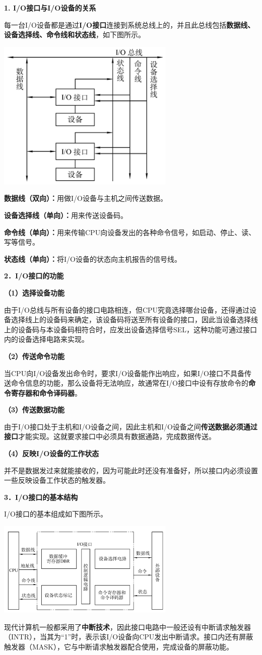 {\textbf{1. I/O接口与I/O设备的关系}}

每一台I/O设备都是通过{\textbf{I/O接口}}连接到系统总线上的，并且此总线包括\textbf{数据线、设备选择线、命令线和状态线}，如下图所示。

\includegraphics[width=3.33333in,height=2.84375in]{png-jpeg-pics/6A896695497C6EA59B53FA9E705171B6.png}

\textbf{数据线（双向）：}用做I/O设备与主机之间传送数据。

\textbf{设备选择线（单向）：}用来传送设备码。

\textbf{命令线（单向）：}用来传输CPU向设备发出的各种命令信号，如启动、停止、读、写等信号。

\textbf{状态线（单向）：}将I/O设备的状态向主机报告的信号线。

{\textbf{2．I/O接口的功能}}

\textbf{（1）选择设备功能}

由于I/O总线与所有设备的接口电路相连，但CPU究竟选择哪台设备，还得通过设备选择线上的设备码来确定，该设备码将送至所有设备的接口，因此当设备选择线上的设备码与本设备码相符合时，应发出设备选择信号SEL，这种功能可通过接口内的设备选择电路来实现。

\textbf{（2）传送命令功能}

当CPU向I/O设备发出命令时，要求I/O设备能作出响应，如果I/O接口不具备传送命令信息的功能，那么设备将无法响应，故通常在I/O接口中设有存放命令的\textbf{命令寄存器和命令译码器}。

\textbf{（3）传送数据功能}

由于I/O接口处于主机和I/O设备之间，因此主机和I/O设备之间\textbf{传送数据必须通过接口}才能实现。这就要求接口中必须具有数据通路，完成数据传送。

\textbf{（4）反映I/O设备的工作状态}

并不是数据发过来就能接收的，因为可能此时还没有准备好，所以接口内必须设置一些反映设备工作状态的触发器。

{\textbf{3．I/O接口的基本结构}}

I/O接口的基本组成如下图所示。

\includegraphics[width=3.33333in,height=1.79167in]{png-jpeg-pics/640D4A2AA720D3DE93F0E3447A74D318.png}

现代计算机一般都采用了\textbf{中断技术}，因此接口电路中一般还设有中断请求触发器（INTR），当其为``1''时，表示该I/O设备向CPU发出中断请求。接口内还有屏蔽触发器（MASK），它与中断请求触发器配合使用，完成设备的屏蔽功能。
